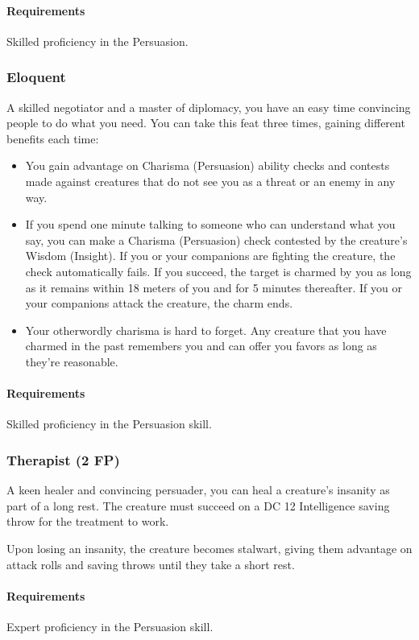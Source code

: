     \paragraph{Requirements} Skilled proficiency in the Persuasion.
\subsubsection{Eloquent} \label{feat::eloquent}
    A skilled negotiator and a master of diplomacy, you have an easy time convincing people to do what you need.
    You can take this feat three times, gaining different benefits each time:
    \begin{itemize}
        \item You gain advantage on Charisma (Persuasion) ability checks and contests made against creatures that do not see you as a threat or an enemy in any way.
        \item If you spend one minute talking to someone who can understand what you say, you can make a Charisma (Persuasion) check contested by the creature's Wisdom (Insight).
        If you or your companions are fighting the creature, the check automatically fails.
        If you succeed, the target is charmed by you as long as it remains within 18 meters of you and for 5 minutes thereafter.
        If you or your companions attack the creature, the charm ends.
        \item Your otherwordly charisma is hard to forget.
        Any creature that you have charmed in the past remembers you and can offer you favors as long as they're reasonable.
    \end{itemize}
    \paragraph{Requirements} Skilled proficiency in the Persuasion skill.
\subsubsection{Therapist (2 FP)} \label{feat::therapist}
    A keen healer and convincing persuader, you can heal a creature's insanity as part of a long rest.
    The creature must succeed on a DC 12 Intelligence saving throw for the treatment to work.

    Upon losing an insanity, the creature becomes stalwart, giving them advantage on attack rolls and saving throws until they take a short rest.
    \paragraph{Requirements} Expert proficiency in the Persuasion skill.


